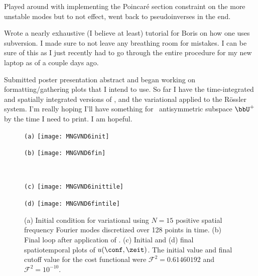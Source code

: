 \begin{description}
{\begin{description}
Played around with implementing the Poincar\'e section constraint on the more unstable modes but to not effect, went back to pseudoinverses in the end.

\item[Misc]
Wrote a nearly exhaustive (I believe at least) tutorial for Boris on how one uses subversion. I made sure to not leave any breathing
room for mistakes. I can be sure of this as I just recently had to go through the entire procedure for my new laptop as of a couple days ago.

\item[Misc2]
Submitted poster presentation abstract and began working on
formatting/gathering plots that I intend to use. So far I have the
time-integrated and spatially integrated versions of , and the
variational {\descent} applied to the R\"ossler system. I'm really hoping
I'll have something for \KS\ antisymmetric subspace $\bbU^+$ by the time
I need to print. I am hopeful.

\end{description}
}

\begin{figure}[ht]
  \begin{minipage}[height=.30\textheight]{.45\textwidth}
    \centering \small{\texttt{(a)}}
    \texttt{[image: MNGVND6init]}
  \end{minipage}
  \begin{minipage}[height=.30\textheight]{.45\textwidth}
    \centering \small{\texttt{(b)}}
    \texttt{[image: MNGVND6fin]}
  \end{minipage}
  \\
  \begin{minipage}[height=.30\textheight]{.45\textwidth}
    \centering \small{\texttt{(c)}}
    \texttt{[image: MNGVND6inittile]}
  \end{minipage}
  \centering
  \begin{minipage}[height=.30\textheight]{.45\textwidth}
    \centering \small{\texttt{(d)}}
    \texttt{[image: MNGVND6fintile]}
  \end{minipage}
   \caption{  \label{fig:MNGVND6}
(a) Initial condition for variational {\descent} using $N=15$ positive spatial
    frequency Fourier modes discretized over 128 points in time.
(b) Final loop after application of {\descent}.
(c) Initial and
(d) final spatiotemporal plots of $u(\conf,\zeit)$. The initial value and final
    cutoff value for the cost functional were $\mathcal{F}^2 = 0.61460192$ and
    $\mathcal{F}^2 = 10^{-10}$.
   }
\end{figure}


\end{description}
